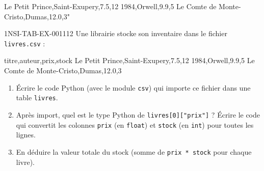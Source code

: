 Le Petit Prince,Saint-Exupery,7.5,12
1984,Orwell,9.9,5
Le Comte de Monte-Cristo,Dumas,12.0,3"
\begin{exercice}{1NSI-TAB-EX-001}{1}{12}
Une librairie stocke son inventaire dans le fichier \lstinline{livres.csv} :
\begin{console}
titre,auteur,prix,stock
Le Petit Prince,Saint-Exupery,7.5,12
1984,Orwell,9.9,5
Le Comte de Monte-Cristo,Dumas,12.0,3
\end{console}
\begin{enumerate}
  \item Écrire le code Python (avec le module \lstinline{csv}) qui importe ce fichier dans une table \lstinline{livres}.
  \item Après import, quel est le type Python de \lstinline{livres[0]["prix"]} ? Écrire le code qui convertit les colonnes \lstinline{prix} (en \lstinline{float}) et \lstinline{stock} (en \lstinline{int}) pour toutes les lignes.
  \item En déduire la valeur totale du stock (somme de \lstinline{prix * stock} pour chaque livre).
\end{enumerate}
\end{exercice}
